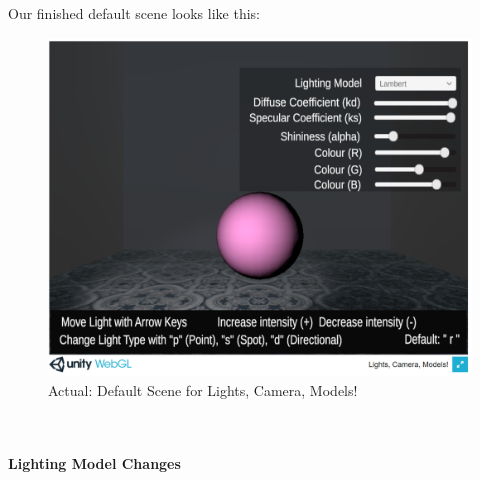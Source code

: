 \documentclass[12pt, titlepage]{article}
\begin{document}
Our finished default scene looks like this:
\begin{figure}
	\centering
	\includegraphics[scale=0.25]{./images/defaultScene-final}
	\caption{Actual: Default Scene for Lights, Camera, Models!}
\end{figure}

~\newline
\paragraph{Lighting Model Changes}
\end{document}
